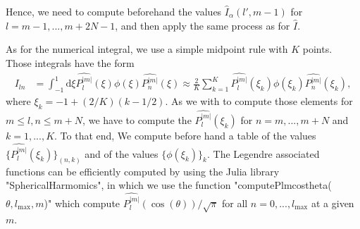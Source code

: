 \documentclass[11pt]{article}
\newcommand{\rd}{\mathrm{d}}
\newcommand{\Pnm}{P_n^{|m|}}
\newcommand{\Plm}{P_l^{|m|}}
\newcommand{\hPnm}{\widehat{\Pnm}}
\newcommand{\hPlm}{\widehat{\Plm}}
\newcommand{\hI}{\widehat{I}}
\begin{document}
Hence, we need to compute beforehand the values $\hI_{\alpha}(l',m-1)$ for $l=m-1,...,m+2N-1$, and then apply the same process as for $\hI$. 

As for the numerical integral, we use a simple midpoint rule with $K$ points. Those integrals have the form
\begin{align*}
I_{ln} &= \int_{-1}^{1} \rd \xi \hPlm(\xi) \phi(\xi) \hPnm(\xi) \approx \frac{2}{K} \sum_{k=1}^{K} \hPlm(\xi_{k}) \phi(\xi_{k}) \hPnm(\xi_{k}),
\end{align*}
where $\xi_{k} = -1 + (2/K)(k-1/2)$. As we with to compute those elements for $m \leq l,n \leq m+N$, we have to compute the $\hPlm(\xi_{k})$ for $n=m,...,m+N$ and $k=1,...,K$. To that end, We compute before hand a table of the values $\{\hPlm(\xi_{k})\}_{(n,k)}$ and of the values $\{\phi(\xi_{k})\}_{k}$. The Legendre associated functions can be efficiently computed by using the Julia library "SphericalHarmomics", in which we use the function "computePlmcostheta($\theta,l_{\max},m$)" which compute $\hPlm(\cos(\theta))/\sqrt{\pi}$ for all $n=0,...,l_{\max}$ at a given $m$.
\end{document}
